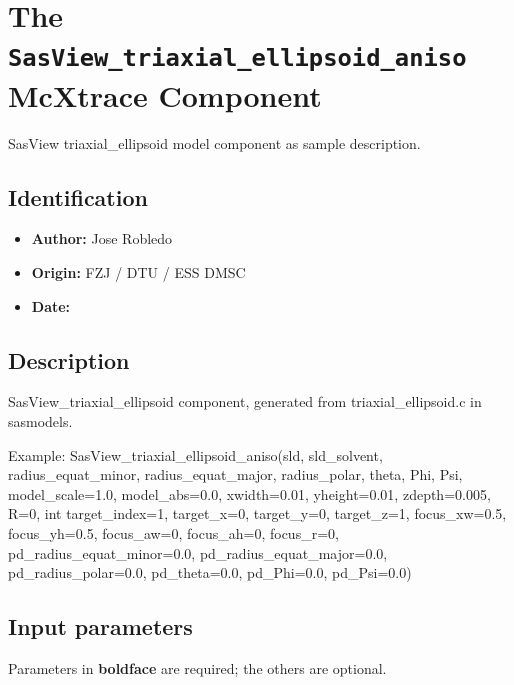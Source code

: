 \section{The \texttt{SasView\_triaxial\_ellipsoid\_aniso} McXtrace Component}
SasView triaxial\_ellipsoid model component as sample description.

\subsection*{Identification}
\begin{itemize}
  \item \textbf{Author:} Jose Robledo
  \item \textbf{Origin:} FZJ / DTU / ESS DMSC
  \item \textbf{Date:} 
\end{itemize}

\subsection*{Description}
SasView\_triaxial\_ellipsoid component, generated from triaxial\_ellipsoid.c in sasmodels.

Example: SasView\_triaxial\_ellipsoid\_aniso(sld, sld\_solvent, radius\_equat\_minor, radius\_equat\_major, radius\_polar, theta, Phi, Psi, model\_scale=1.0, model\_abs=0.0, xwidth=0.01, yheight=0.01, zdepth=0.005, R=0, int target\_index=1, target\_x=0, target\_y=0, target\_z=1, focus\_xw=0.5, focus\_yh=0.5, focus\_aw=0, focus\_ah=0, focus\_r=0, pd\_radius\_equat\_minor=0.0, pd\_radius\_equat\_major=0.0, pd\_radius\_polar=0.0, pd\_theta=0.0, pd\_Phi=0.0, pd\_Psi=0.0)

\subsection*{Input parameters}
Parameters in \textbf{boldface} are required; the others are optional.

